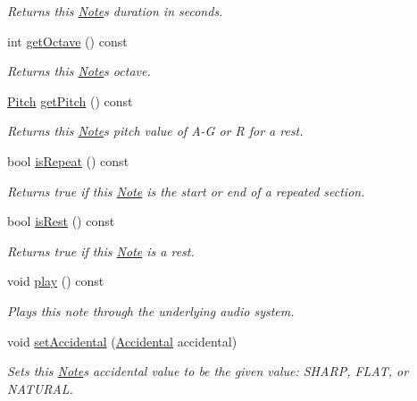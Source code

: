 \begin{DoxyCompactItemize}
\begin{DoxyCompactList}\small\item\em Returns this \mbox{\hyperlink{classNote}{Note}}\textquotesingle{}s duration in seconds. \end{DoxyCompactList}\item 
int \mbox{\hyperlink{classNote_a276c3b157a7cfea998fb206395bcefc1}{get\+Octave}} () const
\begin{DoxyCompactList}\small\item\em Returns this \mbox{\hyperlink{classNote}{Note}}\textquotesingle{}s octave. \end{DoxyCompactList}\item 
\mbox{\hyperlink{classNote_a6753778520a0d8493f6c18f6e6818542}{Pitch}} \mbox{\hyperlink{classNote_a4242384b0cb20e081da9e82c50591caa}{get\+Pitch}} () const
\begin{DoxyCompactList}\small\item\em Returns this \mbox{\hyperlink{classNote}{Note}}\textquotesingle{}s pitch value of A-\/G or R for a rest. \end{DoxyCompactList}\item 
bool \mbox{\hyperlink{classNote_a2b1f400ca39661825e037dc1e671cbd5}{is\+Repeat}} () const
\begin{DoxyCompactList}\small\item\em Returns true if this \mbox{\hyperlink{classNote}{Note}} is the start or end of a repeated section. \end{DoxyCompactList}\item 
bool \mbox{\hyperlink{classNote_a64189c4cbf65dcc5c4464289e7ec59a6}{is\+Rest}} () const
\begin{DoxyCompactList}\small\item\em Returns true if this \mbox{\hyperlink{classNote}{Note}} is a rest. \end{DoxyCompactList}\item 
void \mbox{\hyperlink{classNote_af351bf66fe7175bc6de020b7083f3fb3}{play}} () const
\begin{DoxyCompactList}\small\item\em Plays this note through the underlying audio system. \end{DoxyCompactList}\item 
void \mbox{\hyperlink{classNote_a52c7937fb6be8e867177adb8dc2755ca}{set\+Accidental}} (\mbox{\hyperlink{classNote_a48ac9ae5104f19cec526c22b5323f5d9}{Accidental}} accidental)
\begin{DoxyCompactList}\small\item\em Sets this \mbox{\hyperlink{classNote}{Note}}\textquotesingle{}s accidental value to be the given value\+: S\+H\+A\+RP, F\+L\+AT, or N\+A\+T\+U\+R\+AL. \end{DoxyCompactList}\item 

\end{DoxyCompactItemize}
